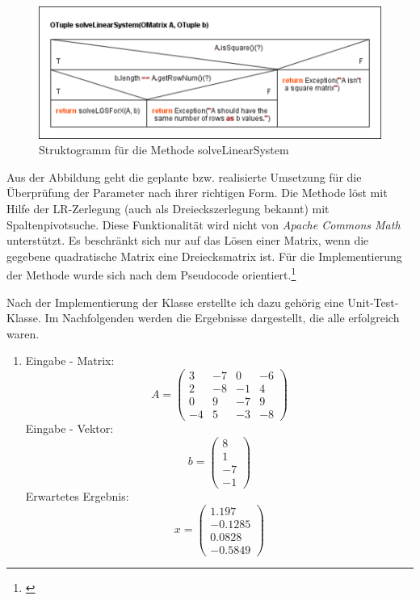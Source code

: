 \begin{figure}[h]
	\includegraphics[width=\columnwidth]{img/solveLinearSystem}
	\caption[Struktogramm für die Methode solveLinearSystem]{Struktogramm für die Methode solveLinearSystem\footnotemark}
\end{figure}

Aus der Abbildung geht die geplante bzw. realisierte Umsetzung für die Überprüfung der Parameter nach ihrer richtigen Form. Die Methode  löst mit Hilfe der LR-Zerlegung (auch als Dreieckszerlegung bekannt) mit Spaltenpivotsuche. Diese Funktionalität wird nicht von \textit{Apache Commons Math} unterstützt. Es beschränkt sich nur auf das Lösen einer Matrix, wenn die gegebene quadratische Matrix eine Dreiecksmatrix ist. Für die Implementierung der Methode wurde sich nach dem Pseudocode orientiert.\footnote{\cite[vgl.][]{gordoncollegemathematicscomputersciencedepartment2019}}

Nach der Implementierung der Klasse erstellte ich dazu gehörig eine Unit-Test-Klasse. Im Nachfolgenden werden die Ergebnisse dargestellt, die alle erfolgreich waren. 
\begin{enumerate}
	\item Eingabe - Matrix: $$ A= \left(\begin{matrix}3&-7&0&-6\\2&-8&-1&4\\0&9&-7&9\\-4&5&-3&-8\end{matrix}\right) $$
  Eingabe - Vektor: $$ b= \left(\begin{matrix} 8\\1\\-7\\-1\end{matrix}\right) $$ Erwartetes Ergebnis: $$ x= \left(\begin{matrix} 1.197\\-0.1285\\0.0828\\-0.5849\end{matrix}\right) $$
	
\end{enumerate}


